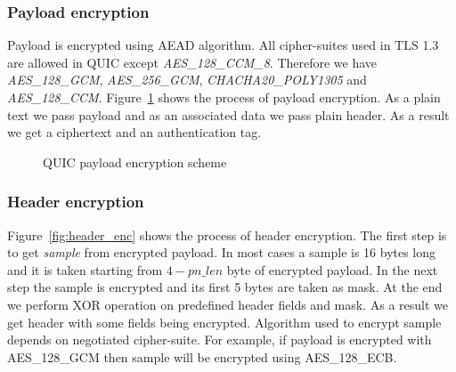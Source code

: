 \subsubsection{Payload encryption}
Payload is encrypted using AEAD algorithm.
All cipher-suites used in TLS 1.3 are allowed in QUIC except \textit{AES\_128\_CCM\_8}.
Therefore we have \textit{AES\_128\_GCM}, \textit{AES\_256\_GCM}, \textit{CHACHA20\_POLY1305} and \textit{AES\_128\_CCM}.
Figure~\ref{fig:payload_enc} shows the process of payload encryption.
As a plain text we pass payload and as an associated data we pass plain header.
As a result we get a ciphertext and an authentication tag.

\begin{figure}[h]
    \centering
    \caption{QUIC payload encryption scheme}
    \label{fig:payload_enc}
\end{figure}

\subsubsection{Header encryption}
Figure~\ref{fig:header_enc} shows the process of header encryption.
The first step is to get \textit{sample} from encrypted payload.
In most cases a sample is 16 bytes long and it is taken starting from $4 - pn\_len$ byte of encrypted payload.
In the next step the sample is encrypted and its first 5 bytes are taken as mask.
At the end we perform XOR operation on predefined header fields and mask.
As a result we get header with some fields being encrypted.
Algorithm used to encrypt sample depends on negotiated cipher-suite.
For example, if payload is encrypted with AES\_128\_GCM then sample will be encrypted using AES\_128\_ECB\@.

